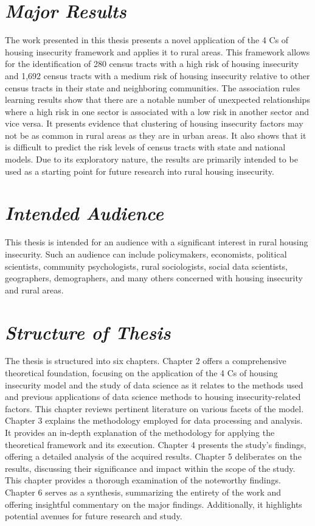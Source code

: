   
\section{\textit{Major Results}} 

The work presented in this thesis presents a novel application of the 4 Cs of housing insecurity framework and applies it to rural areas. This framework allows for the identification of 280 census tracts with a high risk of housing insecurity and 1,692 census tracts with a medium risk of housing insecurity relative to other census tracts in their state and neighboring communities. The association rules learning results show that there are a notable number of unexpected relationships where a high risk in one sector is associated with a low risk in another sector and vice versa. It presents evidence that clustering of housing insecurity factors may not be as common in rural areas as they are in urban areas. It also shows that it is difficult to predict the risk levels of census tracts with state and national models. Due to its exploratory nature, the results are primarily intended to be used as a starting point for future research into rural housing insecurity.  

 

\section{\textit{Intended Audience}} 

This thesis is intended for an audience with a significant interest in rural housing insecurity. Such an audience can include policymakers, economists, political scientists, community psychologists, rural sociologists, social data scientists, geographers, demographers, and many others concerned with housing insecurity and rural areas.  

 

\section{\textit{Structure of Thesis}} 

The thesis is structured into six chapters. Chapter 2 offers a comprehensive theoretical foundation, focusing on the application of the 4 Cs of housing insecurity model and the study of data science as it relates to the methods used and previous applications of data science methods to housing insecurity-related factors. This chapter reviews pertinent literature on various facets of the model. Chapter 3 explains the methodology employed for data processing and analysis. It provides an in-depth explanation of the methodology for applying the theoretical framework and its execution. Chapter 4 presents the study's findings, offering a detailed analysis of the acquired results. Chapter 5 deliberates on the results, discussing their significance and impact within the scope of the study. This chapter provides a thorough examination of the noteworthy findings. Chapter 6 serves as a synthesis, summarizing the entirety of the work and offering insightful commentary on the major findings. Additionally, it highlights potential avenues for future research and study. 

 

\endinput 

 